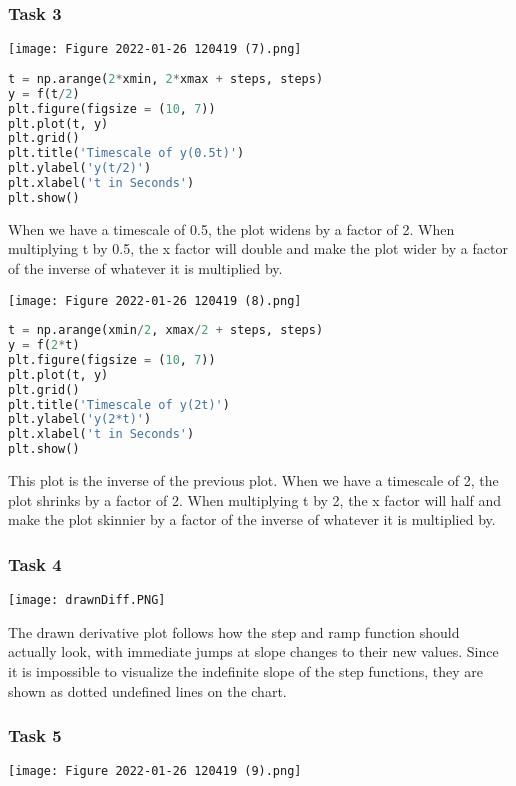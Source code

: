 \documentclass[11pt,a4]{article}
\begin{document}
\subsubsection{Task 3}

\texttt{[image: Figure 2022-01-26 120419 (7).png]}

\begin{lstlisting}[language=Python]
t = np.arange(2*xmin, 2*xmax + steps, steps)
y = f(t/2)
plt.figure(figsize = (10, 7))
plt.plot(t, y)
plt.grid()
plt.title('Timescale of y(0.5t)')
plt.ylabel('y(t/2)')
plt.xlabel('t in Seconds')
plt.show()
\end{lstlisting}

When we have a timescale of 0.5, the plot widens by a factor of 2. When multiplying t by 0.5, the x factor will double and make the plot wider by a factor of the inverse of whatever it is multiplied by.

\texttt{[image: Figure 2022-01-26 120419 (8).png]}

\begin{lstlisting}[language=Python]
t = np.arange(xmin/2, xmax/2 + steps, steps)
y = f(2*t)
plt.figure(figsize = (10, 7))
plt.plot(t, y)
plt.grid()
plt.title('Timescale of y(2t)')
plt.ylabel('y(2*t)')
plt.xlabel('t in Seconds')
plt.show()
\end{lstlisting}

This plot is the inverse of the previous plot. When we have a timescale of 2, the plot shrinks by a factor of 2. When multiplying t by 2, the x factor will half and make the plot skinnier by a factor of the inverse of whatever it is multiplied by.

\subsubsection{Task 4}

\texttt{[image: drawnDiff.PNG]}

The drawn derivative plot follows how the step and ramp function should actually look, with immediate jumps at slope changes to their new values. Since it is impossible to visualize the indefinite slope of the step functions, they are shown as dotted undefined lines on the chart.

\subsubsection{Task 5}

\texttt{[image: Figure 2022-01-26 120419 (9).png]}
\end{document}
